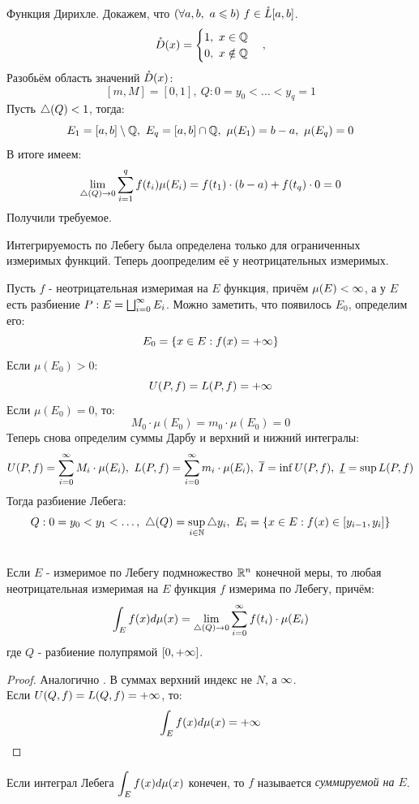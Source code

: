 \begin{example}
	Функция Дирихле. Докажем, что $(\fa a,b,\ a\le b)\ f\in\mc L[a,b]$.
	\[
	\mathring D(x)=
	\begin{cases}
		1,\ x\in\mathbb{Q}\\
		0,\ x\notin\mathbb{Q}
	\end{cases},
	\]
	Разобьём область значений $\mathring D(x)$:
	\[[m,M]=[0,1],\ Q:0=y_0<\dots<y_q=1\]
	Пусть $\triangle(Q)<1$, тогда:
	\[E_1=[a,b]\setminus\Q,\ E_q=[a,b]\cap\Q,\ \mu(E_1)=b-a,\ \mu(E_q)=0\]
	В итоге имеем:
	\[\lim_{\tr(Q)\ra0}\sum_{i=1}^qf(t_i)\mu(E_i)=f(t_1)\cdot(b-a)+f(t_q)\cdot0=0\]
	Получили требуемое.	
\end{example}
\begin{note}
	Интегрируемость по Лебегу была определена только для ограниченных измеримых функций. Теперь доопределим её у неотрицательных измеримых.
\end{note}
\begin{definition}
	Пусть $f$ - неотрицательная измеримая на $E$ функция, причём $\mu(E)<\infty$, а у $E$ есть разбиение $P:E=\bigsqcup_{i=0}^\infty E_i$. Можно заметить, что появилось $E_0$, определим его:
	\[E_0=\{x\in E:f(x)={+\infty}\}\]
	Если $\mu(E_0)>0$:
	\[U(P,f)=L(P,f)={+\infty}\]
	Если $\mu(E_0)=0$, то:
	\[M_0\cdot\mu(E_0)=m_0\cdot\mu(E_0)=0\]
	Теперь снова определим суммы Дарбу и верхний и нижний интегралы:
	\[U(P,f)=\sum_{i=0}^\i M_i\cdot\mu(E_i),\ L(P,f)=\sum_{i=0}^\i m_i\cdot\mu(E_i),\ \v I=\inf U(P,f),\ \uv I=\sup L(P,f)\]
	Тогда разбиение Лебега:
	\[Q:0=y_0<y_1<\dots,\ \tr(Q)=\sup_{i\in\N}\tr y_i,\ E_i=\{x\in E:f(x)\in[y_{i-1},y_i]\}\]
\end{definition}
\begin{theorem}\label{11th2}\\
	Если $E$ - измеримое по Лебегу подмножество $\mathbb{R}^n$ конечной меры, то любая неотрицательная измеримая на $E$ функция $f$ измерима по Лебегу, причём: \[\int_Ef(x)d\mu(x)=\lim_{\tr(Q)\ra0}\sum_{i=0}^\i f(t_i)\cdot\mu(E_i)\]
	где $Q$ - разбиение полупрямой $[0,{+\infty}]$.
\end{theorem}
\begin{proof}
	Аналогично . В суммах верхний индекс не $N$, а $\infty$.\\
	Если $U(Q,f)=L(Q,f)={+\infty}$, то:
	\[\int_Ef(x)d\mu(x)={+\infty}\]
\end{proof}
\begin{definition}
	Если интеграл Лебега $\displaystyle\int_Ef(x)d\mu(x)$ конечен, то $f$ называется \textit{суммируемой на $E$}.
\end{definition}
